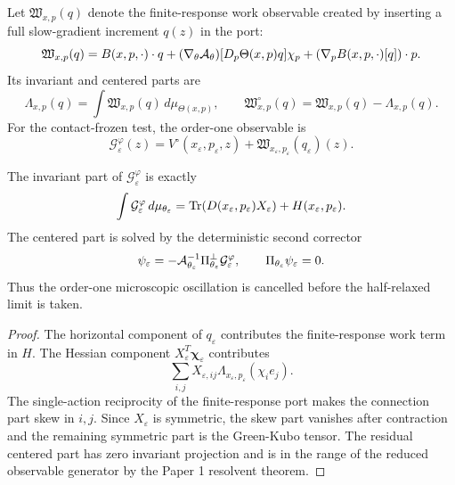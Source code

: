\begin{definition}
\label{def:supp_order_one_work}
Let \(\mathfrak W_{x,p}(q)\) denote the finite-response work observable created
by inserting a full slow-gradient increment \(q(z)\) in the port:
\[
  \mathfrak W_{x,p}(q)
  =
  B(x,p,\cdot)\cdot q
  +(\nabla_\theta\mathcal A_\theta)[D_p\Theta(x,p)q]\chi_p
  +(\nabla_p B(x,p,\cdot)[q])\cdot p.
\]
Its invariant and centered parts are
\[
  \Lambda_{x,p}(q)=\int\mathfrak W_{x,p}(q)\,d\mu_{\Theta(x,p)},
  \qquad
  \mathfrak W^\circ_{x,p}(q)
  =
  \mathfrak W_{x,p}(q)-\Lambda_{x,p}(q).
\]
For the contact-frozen test, the order-one observable is
\[
  \mathcal G_\varepsilon^\varphi(z)
  =
  V^\circ(x_\varepsilon,p_\varepsilon,z)
  +\mathfrak W_{x_\varepsilon,p_\varepsilon}(q_\varepsilon)(z).
\]
\end{definition}

\begin{proposition}
\label{prop:supp_second_cell_average}
The invariant part of \(\mathcal G_\varepsilon^\varphi\) is exactly
\[
  \int \mathcal G_\varepsilon^\varphi\,d\mu_{\theta_\varepsilon}
  =
  \operatorname{Tr}(D(x_\varepsilon,p_\varepsilon)X_\varepsilon)
  +H(x_\varepsilon,p_\varepsilon).
\]
The centered part is solved by the deterministic second corrector
\[
  \psi_\varepsilon
  =
  -\mathcal A_{\theta_\varepsilon}^{-1}
  \Pi^\perp_{\theta_\varepsilon}\mathcal G_\varepsilon^\varphi,
  \qquad
  \Pi_{\theta_\varepsilon}\psi_\varepsilon=0.
\]
Thus the order-one microscopic oscillation is cancelled before the
half-relaxed limit is taken.
\end{proposition}

\begin{proof}
The horizontal component of \(q_\varepsilon\) contributes the finite-response
work term in \(H\).  The Hessian component
\(X_\varepsilon^T\boldsymbol\chi_\varepsilon\) contributes
\[
  \sum_{i,j}X_{\varepsilon,ij}
  \Lambda_{x_\varepsilon,p_\varepsilon}(\chi_i e_j).
\]
The single-action reciprocity of the finite-response port makes the connection
part skew in \(i,j\).  Since \(X_\varepsilon\) is symmetric, the skew part
vanishes after contraction and the remaining symmetric part is the Green-Kubo
tensor.  The residual centered part has zero invariant projection and is in
the range of the reduced observable generator by the Paper 1 resolvent theorem.
\end{proof}

